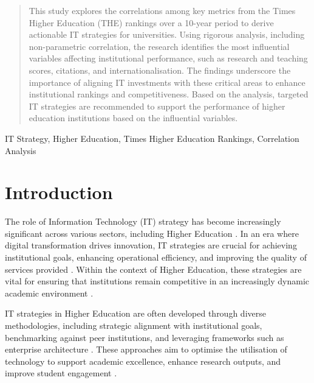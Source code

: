 \documentclass[conference]{IEEEtran}
\begin{document}
\newcommand{\al}[1]{{\textbf{\color{blue} Al: #1}}}

\maketitle

\begin{abstract}
	This study explores the correlations among key metrics from the Times Higher Education (THE) rankings over a 10-year period to derive actionable IT strategies for universities. Using rigorous analysis, including non-parametric correlation, the research identifies the most influential variables affecting institutional performance, such as research and teaching scores, citations, and internationalisation. The findings underscore the importance of aligning IT investments with these critical areas to enhance institutional rankings and competitiveness. Based on the analysis, targeted IT strategies are recommended to support the performance of higher education institutions based on the influential variables.
\end{abstract}

\begin{IEEEkeywords}
	IT Strategy, Higher Education, Times Higher Education Rankings, Correlation Analysis
\end{IEEEkeywords}


\section{Introduction}


The role of Information Technology (IT) strategy has become increasingly significant across various sectors, including Higher Education \cite{hashim2021higher}. In an era where digital transformation drives innovation, IT strategies are crucial for achieving institutional goals, enhancing operational efficiency, and improving the quality of services provided \cite{rahmadi2024research}. Within the context of Higher Education, these strategies are vital for ensuring that institutions remain competitive in an increasingly dynamic academic environment \cite{fernandez2023digital}.

IT strategies in Higher Education are often developed through diverse methodologies, including strategic alignment with institutional goals, benchmarking against peer institutions, and leveraging frameworks such as enterprise architecture \cite{bianchi2023it}. These approaches aim to optimise the utilisation of technology to support academic excellence, enhance research outputs, and improve student engagement \cite{digitalsystems2022strategy}.
\end{document}
